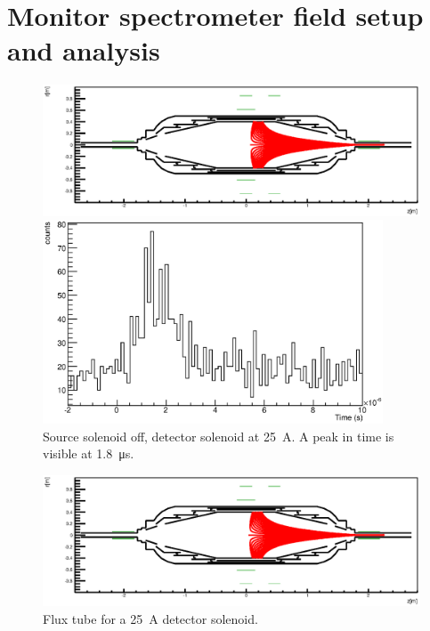 \section{Monitor spectrometer field setup and analysis}
\label{ch:annex:sec:A3}
\begin{figure}
\centering

		\centerline{\includegraphics[width = 1.3\linewidth]{graphics/analysis/monSpec/fieldSimulation/AB.eps} }
	
	\caption[Asymmetric field \SI{50}{\ampere}]{Flux tube for a \SI{50}{\ampere} detector solenoid, \SI{-8}{\ampere} outer central air coil current.}
	\label{fig:ABf}

\centering
	\includegraphics[width = 0.9\textwidth]{graphics/analysis/monSpec/AB.eps}
	\caption[\SI{50}{\ampere} loops]{Source solenoid off, detector solenoid at \SI{25}{\ampere}. A peak in time is visible at \SI{1.8}{\micro\second}. }
	\label{fig:AB}
\end{figure}

\clearpage

\begin{figure}
\centering
			\centerline{\includegraphics[width = 1.3\linewidth]{graphics/analysis/monSpec/fieldSimulation/AA.eps}}
	
	\caption[\SI{25}{\ampere} asymmetric]{Flux tube for a \SI{25}{\ampere} detector solenoid.}
	\label{fig:AAf}
\end{figure}

